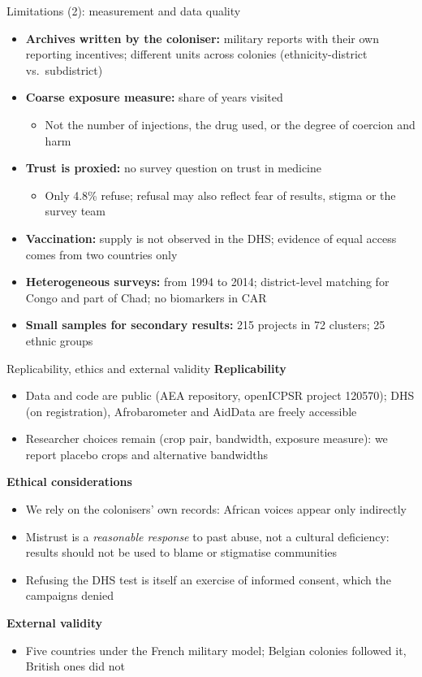 \documentclass[aspectratio=1610]{beamer}
\begin{document}
\begin{frame}{Limitations (2): measurement and data quality}
  \begin{itemize}
    \item \textbf{Archives written by the coloniser:} military reports with their own reporting
      incentives; different units across colonies (ethnicity-district vs.\ subdistrict)
    \item \textbf{Coarse exposure measure:} share of years visited
      \begin{itemize}
        \item Not the number of injections, the drug used, or the degree of coercion and harm
      \end{itemize}
    \item \textbf{Trust is proxied:} no survey question on trust in medicine
      \begin{itemize}
        \item Only 4.8\% refuse; refusal may also reflect fear of results, stigma or the survey team
      \end{itemize}
    \item \textbf{Vaccination:} supply is not observed in the DHS; evidence of equal access comes from
      two countries only
    \item \textbf{Heterogeneous surveys:} from 1994 to 2014; district-level matching for Congo and part of
      Chad; no biomarkers in CAR
    \item \textbf{Small samples for secondary results:} 215 projects in 72 clusters; 25 ethnic groups
  \end{itemize}
\end{frame}

\begin{frame}{Replicability, ethics and external validity}
  \textbf{Replicability}
  \begin{itemize}
    \item Data and code are public (AEA repository, openICPSR project 120570); DHS (on registration),
      Afrobarometer and AidData are freely accessible
    \item Researcher choices remain (crop pair, bandwidth, exposure measure): we report placebo crops
      and alternative bandwidths
  \end{itemize}
  \textbf{Ethical considerations}
  \begin{itemize}
    \item We rely on the colonisers' own records: African voices appear only indirectly
    \item Mistrust is a \emph{reasonable response} to past abuse, not a cultural deficiency:
      results should not be used to blame or stigmatise communities
    \item Refusing the DHS test is itself an exercise of informed consent, which the campaigns denied
  \end{itemize}
  \textbf{External validity}
  \begin{itemize}
    \item Five countries under the French military model; Belgian colonies followed it, British ones did not
  \end{itemize}
\end{frame}
\end{document}

